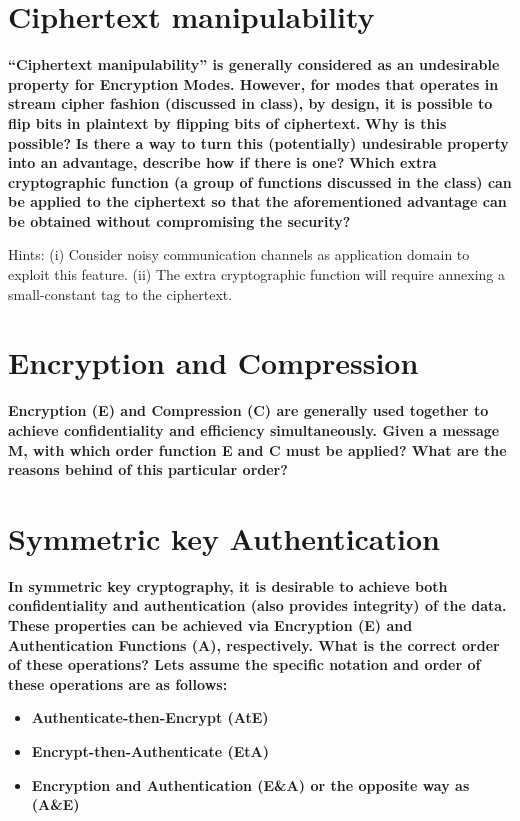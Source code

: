\documentclass[letterpaper,11pt,notitlepage,fleqn]{article}
\begin{document}
\section{Ciphertext  manipulability}
\noindent \textbf{“Ciphertext  manipulability”  is  generally  considered  as  an  undesirable  property  for Encryption  Modes.  However,  for  modes  that  operates  in  stream  cipher  fashion  (discussed  in class), by design, it is possible to flip bits in plaintext by flipping bits of ciphertext.}
\noindent \textbf{Why is this possible?}
\noindent \textbf{Is  there  a  way  to  turn  this  (potentially)  undesirable  property  into  an  advantage, describe how if there is one?}
\noindent \textbf{Which  extra  cryptographic  function  (a  group  of  functions  discussed  in  the  class)  can be applied to the ciphertext so that the aforementioned advantage can be obtained without compromising the security?}

\noindent Hints:  (i) Consider  noisy  communication  channels  as  application  domain  to  exploit  this  feature. 
(ii) The extra cryptographic function will require annexing a small-constant tag to the ciphertext. 

\section{Encryption and Compression}
\noindent \textbf{Encryption (E) and Compression (C) are generally used together to achieve confidentiality and  efficiency  simultaneously. Given  a message M, with which order  function E  and C must be applied? What are the reasons behind of this particular order?}

\section{Symmetric key Authentication}
\noindent \textbf{In  symmetric  key  cryptography,  it  is  desirable  to  achieve  both  confidentiality  and authentication  (also  provides  integrity)  of  the  data.  These  properties  can  be  achieved  via Encryption (E) and Authentication Functions (A), respectively. What is the correct order of these operations? Lets assume the specific notation and order of these operations are as follows:} 
\begin{itemize}
    \item \textbf{Authenticate-then-Encrypt (AtE)}
    \item \textbf{Encrypt-then-Authenticate (EtA)}
    \item \textbf{Encryption and Authentication (E\&A) or the opposite way as (A\&E)}
\end{itemize}
\end{document}
